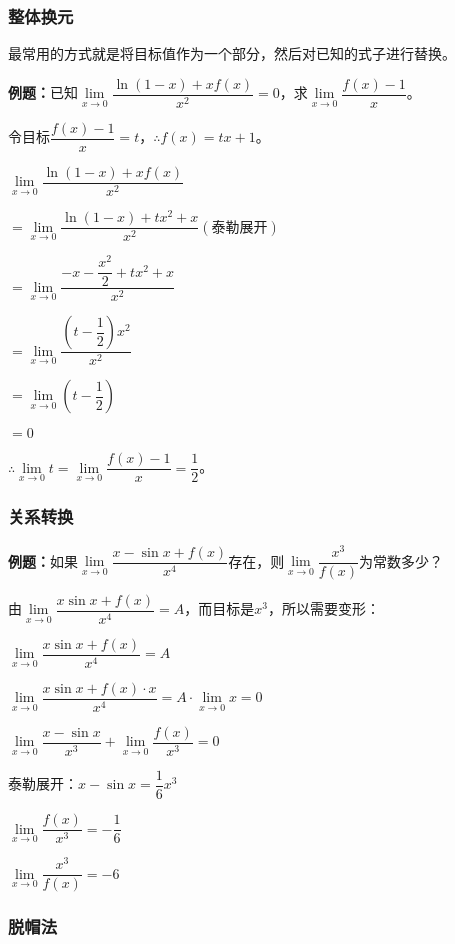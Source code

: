 \documentclass[UTF8, 12pt]{ctexart}
\begin{document}
\subsubsection{整体换元}

最常用的方式就是将目标值作为一个部分，然后对已知的式子进行替换。

\textbf{例题：}已知$\lim\limits_{x\to 0}\dfrac{\ln(1-x)+xf(x)}{x^2}=0$，求$\lim\limits_{x\to 0}\dfrac{f(x)-1}{x}$。\medskip

令目标$\dfrac{f(x)-1}{x}=t$，$\therefore f(x)=tx+1$。\medskip

$\lim\limits_{x\to 0}\dfrac{\ln(1-x)+xf(x)}{x^2}$\medskip

$=\lim\limits_{x\to 0}\dfrac{\ln(1-x)+tx^2+x}{x^2} (\text{泰勒展开})$\medskip

$=\lim\limits_{x\to 0}\dfrac{-x-\dfrac{x^2}{2}+tx^2+x}{x^2}$\medskip

$=\lim\limits_{x\to 0}\dfrac{\left(t-\dfrac{1}{2}\right)x^2}{x^2}$\medskip

$=\lim\limits_{x\to 0}\left(t-\dfrac{1}{2}\right)$

$=0$

$\therefore\lim\limits_{x\to 0}t=\lim\limits_{x\to 0}\dfrac{f(x)-1}{x}=\dfrac{1}{2}$。

\subsubsection{关系转换}

\textbf{例题：}如果$\lim\limits_{x\to 0}\dfrac{x-\sin x+f(x)}{x^4}$存在，则$\lim\limits_{x\to 0}\dfrac{x^3}{f(x)}$为常数多少？

由$\lim\limits_{x\to 0}\dfrac{x\sin x+f(x)}{x^4}=A$，而目标是$x^3$，所以需要变形：

$\lim\limits_{x\to 0}\dfrac{x\sin x+f(x)}{x^4}=A$

$\lim\limits_{x\to 0}\dfrac{x\sin x+f(x)\cdot x}{x^4}=A\cdot\lim\limits_{x\to 0}x=0$

$\lim\limits_{x\to 0}\dfrac{x-\sin x}{x^3}+\lim\limits_{x\to 0}\dfrac{f(x)}{x^3}=0$

$\text{泰勒展开：}x-\sin x=\dfrac{1}{6}x^3$

$\lim\limits_{x\to 0}\dfrac{f(x)}{x^3}=-\dfrac{1}{6}$

$\lim\limits_{x\to 0}\dfrac{x^3}{f(x)}=-6$

\subsubsection{脱帽法}
\end{document}
